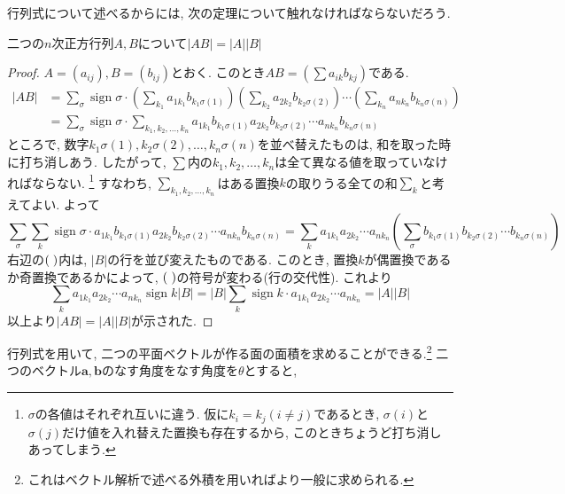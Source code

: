 \documentclass[a4j,dvipdfmx]{jsarticle}
\numberwithin{equation}{section}
\newcommand{\sign}{\mathop{\mathrm{sign}}\nolimits}
\begin{document}
            行列式について述べるからには, 次の定理について触れなければならないだろう.
            \begin{screen}
                二つの$n$次正方行列$A,B$について$|AB|=|A||B|$
            \end{screen}
            \begin{proof}
                $A=(a_{ij}),B=(b_{ij})$とおく. このとき$AB=(\sum a_{ik}b_{kj})$である.
                \begin{align*}
                    |AB|&=\sum_{\sigma}\sign\sigma\cdot \left(\sum_{k_1}a_{1k_1}b_{k_1\sigma(1)}\right)\left(\sum_{k_2}a_{2k_2}b_{k_2\sigma(2)}\right)\cdots\left(\sum_{k_n}a_{nk_n}b_{k_n\sigma(n)}\right)\\
                    &=\sum_{\sigma}\sign\sigma\cdot \sum_{k_1,k_2,\dots,k_n}a_{1k_1}b_{k_1\sigma(1)}a_{2k_2}b_{k_2\sigma(2)}\cdots a_{nk_n}b_{k_n\sigma(n)}
                \end{align*}
                ところで, 数字$k_1\sigma(1),k_2\sigma(2),\dots,k_n\sigma(n)$を並べ替えたものは, 和を取った時に打ち消しあう. したがって, $\sum$内の$k_1,k_2,\dots,k_n$は全て異なる値を取っていなければならない.
                \footnote{$\sigma$の各値はそれぞれ互いに違う. 仮に$k_i=k_j(i\neq j)$であるとき, $\sigma(i)$と$\sigma(j)$だけ値を入れ替えた置換も存在するから, このときちょうど打ち消しあってしまう.}
                すなわち, $\sum\limits_{k_1,k_2,\dots,k_n}$はある置換$k$の取りうる全ての和$\sum\limits_{k}$と考えてよい.  よって
                \begin{equation*}
                    \sum_{\sigma}\sum_{k}\sign\sigma\cdot a_{1k_1}b_{k_1\sigma(1)}a_{2k_2}b_{k_2\sigma(2)}\cdots a_{nk_n}b_{k_n\sigma(n)}=\sum_{k}a_{1k_1}a_{2k_2}\cdots a_{nk_n}\left(\sum_{\sigma}b_{k_1\sigma(1)}b_{k_2\sigma(2)}\cdots b_{k_n\sigma(n)}\right)
                \end{equation*}
                右辺の$(\hspace{1mm})$内は, $|B|$の行を並び変えたものである. このとき, 置換$k$が偶置換であるか奇置換であるかによって, $(\hspace{1mm})$の符号が変わる(行の交代性). これより
                \begin{equation*}
                    \sum_{k}a_{1k_1}a_{2k_2}\cdots a_{nk_n}\sign k|B|=|B|\sum_{k}\sign k\cdot a_{1k_1}a_{2k_2}\cdots a_{nk_n}=|A||B|
                \end{equation*} 
                以上より$|AB|=|A||B|$が示された.
            \end{proof}
            \clearpage
            行列式を用いて, 二つの平面ベクトルが作る面の面積を求めることができる.\footnote{これはベクトル解析で述べる外積を用いればより一般に求められる.} 二つのベクトル$\bm{a},\bm{b}$のなす角度をなす角度を$\theta$とすると, 
\end{document}

